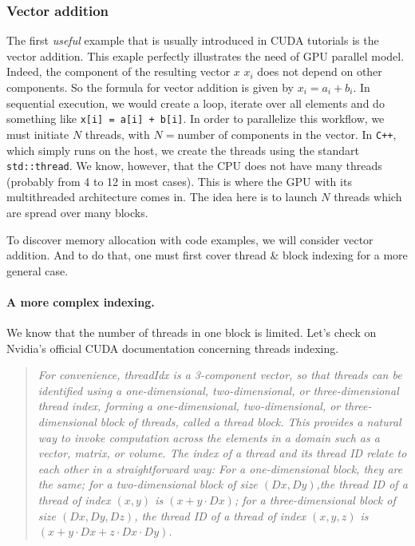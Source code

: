 \subsubsection{Vector addition}
The first \textit{useful} example 
that is usually introduced in CUDA tutorials is the vector addition. This exaple
perfectly illustrates the need of GPU parallel model. Indeed, the component of the resulting
 vector $x$ $x_i$ does not depend on other components. So the formula for vector addition is given by 
 $x_i = a_i + b_i$. In sequential execution, we would create a loop, iterate over all elements and 
do something like \verb|x[i] = a[i] + b[i]|. In order to parallelize this workflow, we must initiate $N$ 
threads, with $N = \text{number of components in the vector}$. In \verb|C++|, which simply runs on the host, we create the threads 
using the standart \verb|std::thread|. We know, however, that the CPU does not have many threads (probably from 4 to 12 in most cases). 
This is where the GPU with its multithreaded architecture comes in. The idea here is to launch $N$ threads which are spread over many blocks.

\newline To discover memory allocation with code examples, we will consider vector addition. And to do that, 
one must first cover thread \& block indexing for a more general case.

\paragraph{A more complex indexing.} 
We know that the number of threads in one 
block is limited. Let's check on Nvidia's official CUDA documentation \cite{center} concerning threads indexing. 
\begin{quote}
   \textsl{For convenience, {\selectfont threadIdx} is a 3-component vector, 
   so that threads can be identified using a one-dimensional, 
   two-dimensional, or three-dimensional thread index, forming a one-dimensional, two-dimensional, 
   or three-dimensional block of threads, called a thread block. This provides a natural way to invoke computation across 
   the elements in a domain such as a vector, matrix, or volume.
   The index of a thread and its thread ID relate to each other 
   in a straightforward way: For a one-dimensional block, they are the same; for 
   a two-dimensional block of size $(Dx, Dy)$,the thread ID of a thread 
   of index $(x, y)$ is $(x + y\cdot Dx)$; for a three-dimensional block of size $(Dx, Dy, Dz)$, the thread ID of a 
   thread of index $(x, y, z)$ is $(x + y\cdot Dx + z\cdot Dx\cdot Dy)$.}
\end{quote}


